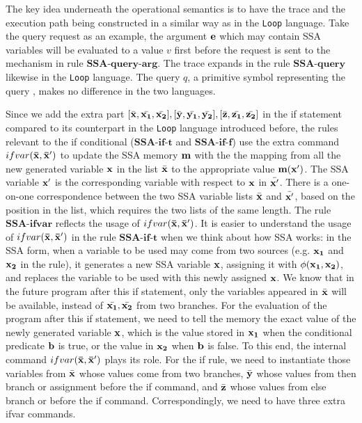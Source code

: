%
The key idea underneath the operational semantics is to have the trace and the execution path being constructed in a similar way as in the {\tt Loop} language. Take the query request as an example, the argument ${\bf{{e}}}$ which may contain SSA variables will be evaluated to a value $v$ first before the request is sent to the mechanism in rule $\textbf{SSA-query-arg}$. The trace expands in the rule $\textbf{SSA-query}$ likewise in the {\tt Loop} language. The query $q$, a primitive symbol representing the query , makes no difference in the two languages. 

Since we add the extra part $[\bar{{\bf{{x}}}}, \bar{{\bf{{x_1}}}}, \bar{{\bf{{x_2}}}}] ,[\bar{{\bf{{y}}}}, \bar{{\bf{{y_1}}}}, \bar{{\bf{{y_2}}}}] ,[\bar{{\bf{{z}}}},\bar{{\bf{{z_1}}}}, \bar{{\bf{{z_2}}}}]  $ in the if statement compared to its counterpart in the {\tt Loop} language introduced before, the rules relevant to the if conditional ($\textbf{SSA-if-t}$ and $\textbf{SSA-if-f}$) use the extra command $ifvar({\bf{{\bar{x}, \bar{x}'}}})$ to update the SSA memory ${\bf{{m}}}$ with the the mapping from all the new generated variable ${\bf{{x}}}$ in the list $\bar{{\bf{{x}}}}$ to the appropriate value ${\bf{{m(x')}}}$. The SSA variable ${\bf{{x'}}}$ is the corresponding variable with respect to ${\bf{{x}}}$ in $\bar{{\bf{{x'}}}}$. There is a one-on-one correspondence between the two SSA variable lists $\bar{{\bf{{x}}}}$ and ${\bar{{\bf{{x'}}}}}$, based on the position in the list, which requires the two lists of the same length.  
The rule $\textbf{SSA-ifvar}$ reflects the usage of $ifvar({\bf{{\bar{x}, \bar{x}'}}})$. It is easier to understand the usage of $ifvar({\bf{{\bar{x}, \bar{x}'}}})$ in the rule $\textbf{SSA-if-t}$ when we think about how SSA works: in the SSA form, when a variable to be used may come from two sources (e.g. ${\bf{{x_1}}}$ and ${\bf{{x_2}}}$ in the rule), it generates a new SSA variable ${\bf{{x}}}$, assigning it with $\phi({\bf{{x_1}}}, {\bf{{x_2}}})$,  and replaces the variable to be used with this newly assigned ${\bf{{x}}}$. We know that in the future program after this if statement, only the variables appeared in $\bar{{\bf{{x}}}}$ will be available, instead of   $\bar{{\bf{{x_1}}}}, \bar{{\bf{{x_2}}}}$ from two branches. For the evaluation of the program after this if statement, we need to tell the memory the exact value of the newly generated variable ${\bf{{x}}}$, which is the value stored in ${\bf{{x_1}}}$ when the conditional predicate ${\bf{{b}}}$ is true, or the value in ${\bf{{x_2}}}$ when ${\bf{{b}}}$ is false. To this end, the internal command $ifvar({\bf{{\bar{x}, \bar{x}'}}})$ plays its role. For the if rule, we need to instantiate those variables from $\bar{{\bf{{x}}}}$ whose values come from two branches, $\bar{{\bf{{y}}}}$ whose values from then branch or assignment before the if command, and $\bar{{\bf{{z}}}}$ whose values from else branch or before the if command. Correspondingly, we need to have three extra ifvar commands.   

